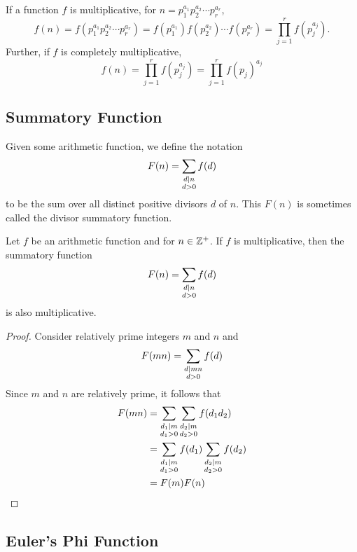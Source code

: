 If a function $f$ is multiplicative, for $n = p_1^{a_1}p_2^{a_2}\cdots p_r^{a_r}$,
$$
f(n) = f(p_1^{a_1} p_2^{a_2} \cdots p_r^{a_r}) = f(p_1^{a_1}) f(p_2^{a_2}) \cdots f(p_r^{a_r}) = \prod_{j=1}^r f(p_j^{a_j}).
$$
Further, if $f$ is completely multiplicative,
$$
f(n) = \prod_{j=1}^r f(p_j^{a_j}) = \prod_{j=1}^r f(p_j)^{a_j}
$$

\subsection{Summatory Function}

\begin{definition}
    Given some arithmetic function, we define the notation
    $$
    F(n) = \sum_{\substack{d \mathrel{\mid} n \\ d > 0}} f(d)
    $$
    to be the sum over all distinct positive divisors $d$ of $n$. This $F(n)$ is sometimes called the divisor summatory function.
\end{definition}

\begin{theorem} \label{thm:summatory-func-mult}
    Let $f$ be an arithmetic function and for $n \in \mathbb{Z}^+$. If $f$ is multiplicative, then the summatory function
    $$
    F(n) = \sum_{\substack{d \mathrel{\mid} n \\ d > 0}} f(d)
    $$
    is also multiplicative.
\end{theorem}

\begin{proof}
    Consider relatively prime integers $m$ and $n$ and
    $$
    F(mn) = \sum_{\substack{d \mathrel{\mid} mn \\ d > 0}} f(d)
    $$
    Since $m$ and $n$ are relatively prime, it follows that
    $$
    \begin{aligned}
        F(mn) &= \sum_{\substack{d_1 \mathrel{\mid} m \\ d_1 > 0}}\sum_{\substack{d_2 \mathrel{\mid} m \\ d_2 > 0}} f(d_1 d_2) \\
        &=  \sum_{\substack{d_1 \mathrel{\mid} m \\ d_1 > 0}} f(d_1) \sum_{\substack{d_2 \mathrel{\mid} m \\ d_2 > 0}} f(d_2) \\
        &= F(m) F(n)
    \end{aligned}
    $$
\end{proof}

\subsection{Euler's Phi Function}

